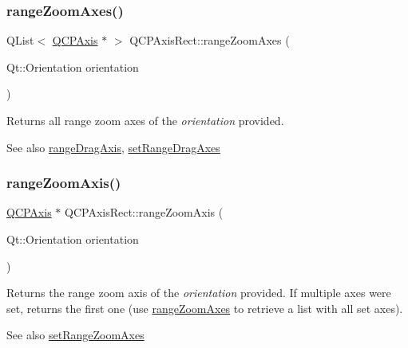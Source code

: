 \subsubsection{\texorpdfstring{range\+Zoom\+Axes()}{rangeZoomAxes()}}
{\footnotesize\ttfamily Q\+List$<$ \hyperlink{classQCPAxis}{Q\+C\+P\+Axis} $\ast$ $>$ Q\+C\+P\+Axis\+Rect\+::range\+Zoom\+Axes (\begin{DoxyParamCaption}\item[{Qt\+::\+Orientation}]{orientation }\end{DoxyParamCaption})}

Returns all range zoom axes of the {\itshape orientation} provided.

\begin{DoxySeeAlso}{See also}
\hyperlink{classQCPAxisRect_a6d7c22cfc54fac7a3d6ef80b133a8574}{range\+Drag\+Axis}, \hyperlink{classQCPAxisRect_a648cce336bd99daac4a5ca3e5743775d}{set\+Range\+Drag\+Axes} 
\end{DoxySeeAlso}
\mbox{\label{classQCPAxisRect_a679c63f2b8daccfe6ec5110dce3dd3b6}} 
\subsubsection{\texorpdfstring{range\+Zoom\+Axis()}{rangeZoomAxis()}}
{\footnotesize\ttfamily \hyperlink{classQCPAxis}{Q\+C\+P\+Axis} $\ast$ Q\+C\+P\+Axis\+Rect\+::range\+Zoom\+Axis (\begin{DoxyParamCaption}\item[{Qt\+::\+Orientation}]{orientation }\end{DoxyParamCaption})}

Returns the range zoom axis of the {\itshape orientation} provided. If multiple axes were set, returns the first one (use \hyperlink{classQCPAxisRect_a86aac0f435f209d60dacd22cda10c104}{range\+Zoom\+Axes} to retrieve a list with all set axes).

\begin{DoxySeeAlso}{See also}
\hyperlink{classQCPAxisRect_a9442cca2aa358405f39a64d51eca13d2}{set\+Range\+Zoom\+Axes} 
\end{DoxySeeAlso}
\mbox{\label{classQCPAxisRect_ae4e6c4d143aacc88d2d3c56f117c2fe1}} 
